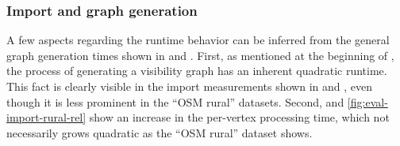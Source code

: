 		\subsubsection{Import and graph generation}
		
			A few aspects regarding the runtime behavior can be inferred from the general graph generation times shown in  and .
			First, as mentioned at the beginning of , the process of generating a visibility graph has an inherent quadratic runtime.
			This fact is clearly visible in the import measurements shown in  and , even though it is less prominent in the \enquote{OSM rural} datasets.
			Second,  and \ref{fig:eval-import-rural-rel} show an increase in the per-vertex processing time, which not necessarily grows quadratic as the \enquote{OSM rural} dataset shows.
			
